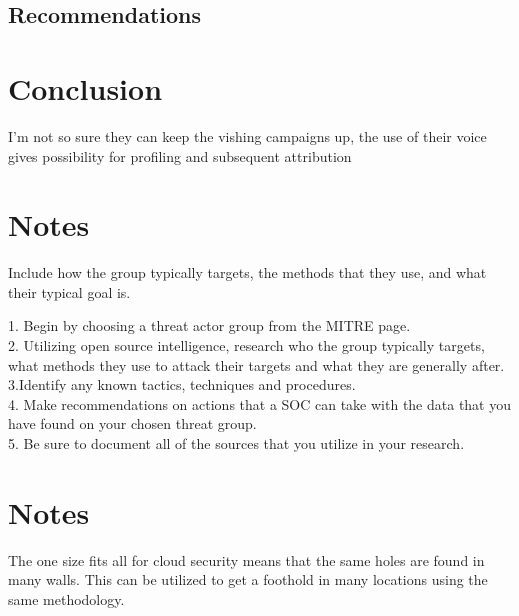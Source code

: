 \documentclass[
	letterpaper, %
	10pt, %
	unnumberedsections, %
	twoside, %
]{APAAssignment}
\begin{document}
\subsection{Recommendations}



\section{Conclusion}
I'm not so sure they can keep the vishing campaigns up, the use of their voice gives possibility for profiling and subsequent attribution



\section{Notes}
Include how the group typically targets, the methods that they use, and what their typical goal is.

1. Begin by choosing a threat actor group from the MITRE page.\\
2. Utilizing open source intelligence, research who the group typically targets, what methods they use to attack their targets and what they are generally after.\\
3.Identify any known tactics, techniques and procedures.\\
4. Make recommendations on actions that a SOC can take with the data that you have found on your chosen threat group. \\
5. Be sure to document all of the sources that you utilize in your research. \\


\section{Notes}
The one size fits all for cloud security means that the same holes are found in many walls. This can be utilized to get a foothold in many locations using the same methodology.











%
\end{document}
